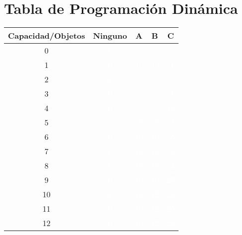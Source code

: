 \documentclass{article}
\begin{document}
\section*{Tabla de Programación Dinámica}
\begin{center}
\scriptsize
\begin{tabular}{|c|c|c|c|c|}
\hline
Capacidad/Objetos & Ninguno & A & B & C \\ \hline
0 & \cellcolor{rojo}\textcolor{white}{0} & \cellcolor{rojo}\textcolor{white}{0} & \cellcolor{rojo}\textcolor{white}{0} & \cellcolor{rojo}\textcolor{white}{0} \\ \hline
1 & \cellcolor{rojo}\textcolor{white}{0} & \cellcolor{rojo}\textcolor{white}{0} & \cellcolor{rojo}\textcolor{white}{0} & \cellcolor{rojo}\textcolor{white}{0} \\ \hline
2 & \cellcolor{rojo}\textcolor{white}{0} & \cellcolor{rojo}\textcolor{white}{0} & \cellcolor{rojo}\textcolor{white}{0} & \cellcolor{rojo}\textcolor{white}{0} \\ \hline
3 & \cellcolor{rojo}\textcolor{white}{0} & \cellcolor{rojo}\textcolor{white}{0} & \cellcolor{rojo}\textcolor{white}{0} & \cellcolor{rojo}\textcolor{white}{0} \\ \hline
4 & \cellcolor{rojo}\textcolor{white}{0} & \cellcolor{rojo}\textcolor{white}{0} & \cellcolor{rojo}\textcolor{white}{0} & \cellcolor{verde}\textcolor{white}{15} \\ \hline
5 & \cellcolor{rojo}\textcolor{white}{0} & \cellcolor{verde}\textcolor{white}{10} & \cellcolor{rojo}\textcolor{white}{10} & \cellcolor{verde}\textcolor{white}{15} \\ \hline
6 & \cellcolor{rojo}\textcolor{white}{0} & \cellcolor{verde}\textcolor{white}{10} & \cellcolor{rojo}\textcolor{white}{10} & \cellcolor{verde}\textcolor{white}{15} \\ \hline
7 & \cellcolor{rojo}\textcolor{white}{0} & \cellcolor{verde}\textcolor{white}{10} & \cellcolor{rojo}\textcolor{white}{10} & \cellcolor{verde}\textcolor{white}{15} \\ \hline
8 & \cellcolor{rojo}\textcolor{white}{0} & \cellcolor{verde}\textcolor{white}{10} & \cellcolor{rojo}\textcolor{white}{10} & \cellcolor{verde}\textcolor{white}{15} \\ \hline
9 & \cellcolor{rojo}\textcolor{white}{0} & \cellcolor{verde}\textcolor{white}{10} & \cellcolor{rojo}\textcolor{white}{10} & \cellcolor{verde}\textcolor{white}{25} \\ \hline
10 & \cellcolor{rojo}\textcolor{white}{0} & \cellcolor{verde}\textcolor{white}{10} & \cellcolor{verde}\textcolor{white}{12} & \cellcolor{verde}\textcolor{white}{25} \\ \hline
11 & \cellcolor{rojo}\textcolor{white}{0} & \cellcolor{verde}\textcolor{white}{10} & \cellcolor{verde}\textcolor{white}{12} & \cellcolor{verde}\textcolor{white}{25} \\ \hline
12 & \cellcolor{rojo}\textcolor{white}{0} & \cellcolor{verde}\textcolor{white}{10} & \cellcolor{verde}\textcolor{white}{12} & \cellcolor{verde}\textcolor{white}{25} \\ \hline
\end{tabular}
\end{center}
\normalsize
\end{document}
